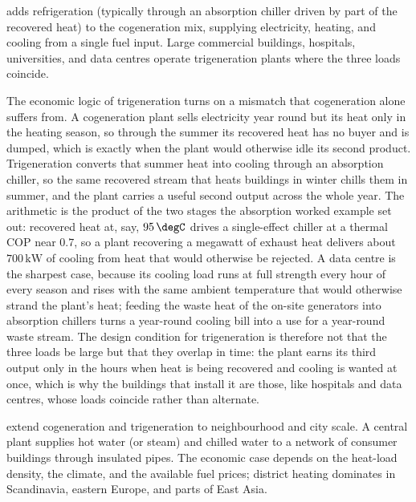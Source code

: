  adds refrigeration (typically through an
absorption chiller driven by part of the recovered heat) to the
cogeneration mix, supplying electricity, heating, and cooling from a
single fuel input. Large commercial buildings, hospitals,
universities, and data centres operate trigeneration plants where the
three loads coincide.

The economic logic of trigeneration turns on a mismatch that cogeneration alone
suffers from. A cogeneration plant sells electricity year round but its heat only
in the heating season, so through the summer its recovered heat has no buyer and
is dumped, which is exactly when the plant would otherwise idle its second
product. Trigeneration converts that summer heat into cooling through an
absorption chiller, so the same recovered stream that heats buildings in winter
chills them in summer, and the plant carries a useful second output across the
whole year. The arithmetic is the product of the two stages the absorption worked
example set out: recovered heat at, say, $95\,\degC$ drives a single-effect
chiller at a thermal COP near $0.7$, so a plant recovering a megawatt of exhaust
heat delivers about $700\,\text{kW}$ of cooling from heat that would otherwise be
rejected. A data centre is the sharpest case, because its cooling load runs at
full strength every hour of every season and rises with the same ambient
temperature that would otherwise strand the plant's heat; feeding the waste heat
of the on-site generators into absorption chillers turns a year-round cooling bill
into a use for a year-round waste stream. The design condition for trigeneration
is therefore not that the three loads be large but that they overlap in time: the
plant earns its third output only in the hours when heat is being recovered and
cooling is wanted at once, which is why the buildings that install it are those,
like hospitals and data centres, whose loads coincide rather than alternate.

 extend cogeneration
and trigeneration to neighbourhood and city scale. A central plant
supplies hot water (or steam) and chilled water to a network of
consumer buildings through insulated pipes. The economic case
depends on the heat-load density, the climate, and the available fuel
prices; district heating dominates in Scandinavia, eastern Europe,
and parts of East Asia.

